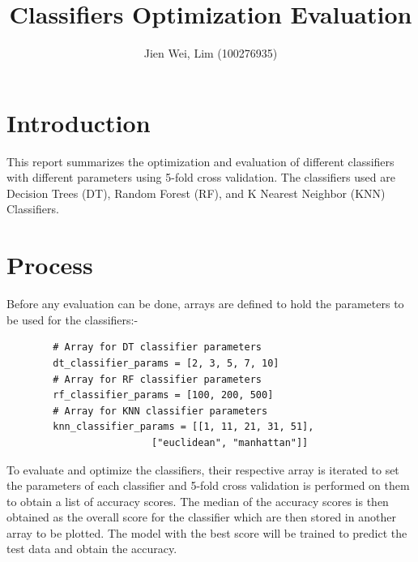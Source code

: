 \documentclass{article}
\title{Classifiers Optimization Evaluation}
\author{Jien Wei, Lim (100276935)}
\begin{document}
	\maketitle
	\section{Introduction}
	This report summarizes the optimization and evaluation of different classifiers with different parameters using 5-fold cross validation. The classifiers used are Decision Trees (DT), Random Forest (RF), and K Nearest Neighbor (KNN) Classifiers. 
	\section{Process}
	Before any evaluation can be done, arrays are defined to hold the parameters to be used for the classifiers:- 
	\begin{verbatim}
		# Array for DT classifier parameters
		dt_classifier_params = [2, 3, 5, 7, 10]
		# Array for RF classifier parameters
		rf_classifier_params = [100, 200, 500]
		# Array for KNN classifier parameters
		knn_classifier_params = [[1, 11, 21, 31, 51], 
                         ["euclidean", "manhattan"]]
	\end{verbatim}
	To evaluate and optimize the classifiers, their respective array is iterated to set the parameters of each classifier and 5-fold cross validation is performed on them to obtain a list of accuracy scores. The median of the accuracy scores is then obtained as the overall score for the classifier which are then stored in another array to be plotted. The model with the best score will be trained to predict the test data and obtain the accuracy. 
	
\end{document}
